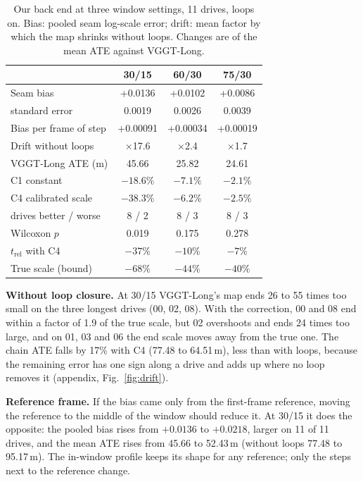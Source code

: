 \documentclass[conference]{IEEEtran}
\begin{document}
\begin{table}[t]
\centering
\caption{Our back end at three window settings, 11 drives, loops on. Bias: pooled seam log-scale error; drift: mean
factor by which the map shrinks without loops. Changes are of the mean ATE against VGGT-Long.}
\label{tab:chunks}
\footnotesize
\begin{tabular}{lccc}
\toprule
& 30/15 & 60/30 & 75/30 \\
\midrule
Seam bias & +0.0136 & +0.0102 & +0.0086 \\
\quad standard error & 0.0019 & 0.0026 & 0.0039 \\
Bias per frame of step & +0.00091 & +0.00034 & +0.00019 \\
Drift without loops & $\times$17.6 & $\times$2.4 & $\times$1.7 \\
\midrule
VGGT-Long ATE (m) & 45.66 & 25.82 & 24.61 \\
C1 constant & $-18.6\%$ & $-7.1\%$ & $-2.1\%$ \\
C4 calibrated scale & $\mathbf{-38.3\%}$ & $-6.2\%$ & $-2.5\%$ \\
\quad drives better / worse & 8 / 2 & 8 / 3 & 8 / 3 \\
\quad Wilcoxon $p$ & 0.019 & 0.175 & 0.278 \\
$t_\mathrm{rel}$ with C4 & $-37\%$ & $-10\%$ & $-7\%$ \\
True scale (bound) & $-68\%$ & $-44\%$ & $-40\%$ \\
\bottomrule
\end{tabular}
\end{table}

\textbf{Without loop closure.} At 30/15 VGGT-Long's map ends 26 to 55 times too small on the three longest drives
(00, 02, 08). With the correction, 00 and 08 end within a factor of 1.9 of the true scale, but 02 overshoots and ends
24 times too large, and on 01, 03 and 06 the end scale moves away from the true one. The chain ATE falls
by 17\% with C4 (77.48 to 64.51\,m), less than with loops, because the remaining error has one sign along a drive and
adds up where no loop removes it (appendix, Fig.~\ref{fig:drift}).



\textbf{Reference frame.} If the bias came only from the first-frame reference, moving the reference to the middle of
the window should reduce it. At 30/15 it does the opposite: the pooled bias rises from $+0.0136$ to $+0.0218$, larger on
11 of 11 drives, and the mean ATE rises from 45.66 to 52.43\,m (without loops 77.48 to 95.17\,m). The in-window profile
keeps its shape for any reference; only the steps next to the reference change.
\end{document}
